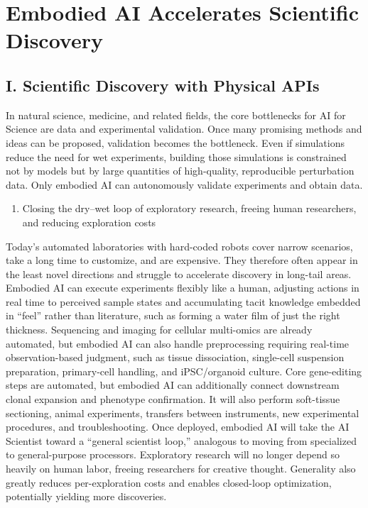 \setcounter{section}{1}

\hypertarget{embodied-ai-accelerates-scientific-discovery}{%
\section{Embodied AI Accelerates Scientific Discovery}\label{embodied-ai-accelerates-scientific-discovery}}

\hypertarget{i.-scientific-discovery-with-physical-apis}{%
\subsection{I. Scientific Discovery with Physical APIs}\label{i.-scientific-discovery-with-physical-apis}}

In natural science, medicine, and related fields, the core bottlenecks for AI for Science are data and experimental validation. Once many promising methods and ideas can be proposed, validation becomes the bottleneck. Even if simulations reduce the need for wet experiments, building those simulations is constrained not by models but by large quantities of high-quality, reproducible perturbation data. Only embodied AI can autonomously validate experiments and obtain data.

\begin{enumerate}
\def\labelenumi{\arabic{enumi}.}
\tightlist
\item
  Closing the dry--wet loop of exploratory research, freeing human researchers, and reducing exploration costs
\end{enumerate}

Today's automated laboratories with hard-coded robots cover narrow scenarios, take a long time to customize, and are expensive. They therefore often appear in the least novel directions and struggle to accelerate discovery in long-tail areas. Embodied AI can execute experiments flexibly like a human, adjusting actions in real time to perceived sample states and accumulating tacit knowledge embedded in ``feel'' rather than literature, such as forming a water film of just the right thickness. Sequencing and imaging for cellular multi-omics are already automated, but embodied AI can also handle preprocessing requiring real-time observation-based judgment, such as tissue dissociation, single-cell suspension preparation, primary-cell handling, and iPSC/organoid culture. Core gene-editing steps are automated, but embodied AI can additionally connect downstream clonal expansion and phenotype confirmation. It will also perform soft-tissue sectioning, animal experiments, transfers between instruments, new experimental procedures, and troubleshooting. Once deployed, embodied AI will take the AI Scientist toward a ``general scientist loop,'' analogous to moving from specialized to general-purpose processors. Exploratory research will no longer depend so heavily on human labor, freeing researchers for creative thought. Generality also greatly reduces per-exploration costs and enables closed-loop optimization, potentially yielding more discoveries.

